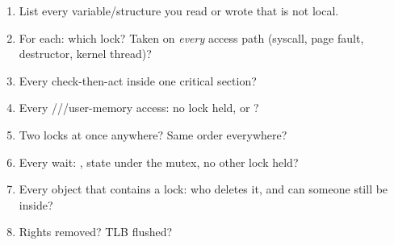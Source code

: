 \begin{lockbox}[title={Checklist after every task}]
\begin{enumerate}
\item List every variable/structure you read or wrote that is not local.
\item For each: which lock? Taken on \emph{every} access path (syscall, page fault, destructor, kernel thread)?
\item Every check-then-act inside one critical section?
\item Every ///user-memory access: no lock held, or ?
\item Two locks at once anywhere? Same order everywhere?
\item Every wait: , state under the mutex, no other lock held?
\item Every object that contains a lock: who deletes it, and can someone still be inside?
\item Rights removed? TLB flushed?
\end{enumerate}
\end{lockbox}
